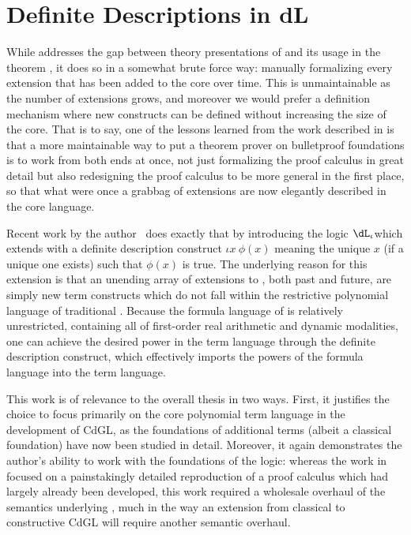 \documentclass[12pt]{cmuthesis}
\theoremstyle{definition}
\theoremstyle{remark}
\newcommand{\meps}[2]{\iota{#1}~{#2}}
\newcommand{\rref}[2][]{\prettyref{#2}}
\newcommand{\CdGL}{\textsf{CdGL}\xspace}
\newcommand{\dLi}{\ensuremath{\dL_\iota}}
\begin{document}
\section{Definite Descriptions in dL}
\label{sec:definite-description}
While \rref{sec:isabelle-fml} addresses the gap between theory presentations of \dL and its usage in the theorem \KeYmaeraX, it does so in a somewhat brute force way: manually formalizing every extension that has been added to the \KeYmaeraX core over time.
This is unmaintainable as the number of extensions grows, and moreover we would prefer a definition mechanism where new constructs can be defined without increasing the size of the core.
That is to say, one of the lessons learned from the work described in \rref{sec:isabelle-fml} is that a more maintainable way to put a theorem prover on bulletproof foundations is to work from both ends at once, not just formalizing the proof calculus in great detail but also redesigning the proof calculus to be more general in the first place, so that what were once a grabbag of extensions are now elegantly described in the core language.

Recent work by the author~\cite{hilbert-epsilons} does exactly that by introducing the logic \dLi which extends \dL with a definite description construct $\meps{x}{\phi(x)}$ meaning the unique $x$ (if a unique one exists) such that $\phi(x)$ is true.
The underlying reason for this extension is that an unending array of extensions to \dL, both past and future, are simply new term constructs which do not fall within the restrictive polynomial language of traditional \dL.
Because the formula language of \dL is relatively unrestricted, containing all of first-order real arithmetic and dynamic modalities, one can achieve the desired power in the term language through the definite description construct, which effectively imports the powers of the formula language into the term language.

This work is of relevance to the overall thesis in two ways.
First, it justifies the choice to focus primarily on the core polynomial term language in the development of \CdGL, as the foundations of additional terms (albeit a classical foundation) have now been studied in detail.
Moreover, it again demonstrates the author's ability to work with the foundations of the logic: whereas the work in \rref{sec:isabelle-fml} focused on a painstakingly detailed reproduction of a proof calculus which had largely already been developed, this work required a wholesale overhaul of the semantics underlying \dL, much in the way an extension from classical \dGL to constructive \CdGL will require another semantic overhaul.
\end{document}
